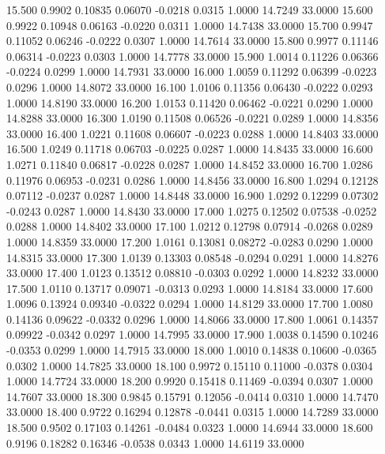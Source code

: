   15.500   0.9902   0.10835   0.06070  -0.0218   0.0315   1.0000  14.7249  33.0000
  15.600   0.9922   0.10948   0.06163  -0.0220   0.0311   1.0000  14.7438  33.0000
  15.700   0.9947   0.11052   0.06246  -0.0222   0.0307   1.0000  14.7614  33.0000
  15.800   0.9977   0.11146   0.06314  -0.0223   0.0303   1.0000  14.7778  33.0000
  15.900   1.0014   0.11226   0.06366  -0.0224   0.0299   1.0000  14.7931  33.0000
  16.000   1.0059   0.11292   0.06399  -0.0223   0.0296   1.0000  14.8072  33.0000
  16.100   1.0106   0.11356   0.06430  -0.0222   0.0293   1.0000  14.8190  33.0000
  16.200   1.0153   0.11420   0.06462  -0.0221   0.0290   1.0000  14.8288  33.0000
  16.300   1.0190   0.11508   0.06526  -0.0221   0.0289   1.0000  14.8356  33.0000
  16.400   1.0221   0.11608   0.06607  -0.0223   0.0288   1.0000  14.8403  33.0000
  16.500   1.0249   0.11718   0.06703  -0.0225   0.0287   1.0000  14.8435  33.0000
  16.600   1.0271   0.11840   0.06817  -0.0228   0.0287   1.0000  14.8452  33.0000
  16.700   1.0286   0.11976   0.06953  -0.0231   0.0286   1.0000  14.8456  33.0000
  16.800   1.0294   0.12128   0.07112  -0.0237   0.0287   1.0000  14.8448  33.0000
  16.900   1.0292   0.12299   0.07302  -0.0243   0.0287   1.0000  14.8430  33.0000
  17.000   1.0275   0.12502   0.07538  -0.0252   0.0288   1.0000  14.8402  33.0000
  17.100   1.0212   0.12798   0.07914  -0.0268   0.0289   1.0000  14.8359  33.0000
  17.200   1.0161   0.13081   0.08272  -0.0283   0.0290   1.0000  14.8315  33.0000
  17.300   1.0139   0.13303   0.08548  -0.0294   0.0291   1.0000  14.8276  33.0000
  17.400   1.0123   0.13512   0.08810  -0.0303   0.0292   1.0000  14.8232  33.0000
  17.500   1.0110   0.13717   0.09071  -0.0313   0.0293   1.0000  14.8184  33.0000
  17.600   1.0096   0.13924   0.09340  -0.0322   0.0294   1.0000  14.8129  33.0000
  17.700   1.0080   0.14136   0.09622  -0.0332   0.0296   1.0000  14.8066  33.0000
  17.800   1.0061   0.14357   0.09922  -0.0342   0.0297   1.0000  14.7995  33.0000
  17.900   1.0038   0.14590   0.10246  -0.0353   0.0299   1.0000  14.7915  33.0000
  18.000   1.0010   0.14838   0.10600  -0.0365   0.0302   1.0000  14.7825  33.0000
  18.100   0.9972   0.15110   0.11000  -0.0378   0.0304   1.0000  14.7724  33.0000
  18.200   0.9920   0.15418   0.11469  -0.0394   0.0307   1.0000  14.7607  33.0000
  18.300   0.9845   0.15791   0.12056  -0.0414   0.0310   1.0000  14.7470  33.0000
  18.400   0.9722   0.16294   0.12878  -0.0441   0.0315   1.0000  14.7289  33.0000
  18.500   0.9502   0.17103   0.14261  -0.0484   0.0323   1.0000  14.6944  33.0000
  18.600   0.9196   0.18282   0.16346  -0.0538   0.0343   1.0000  14.6119  33.0000
